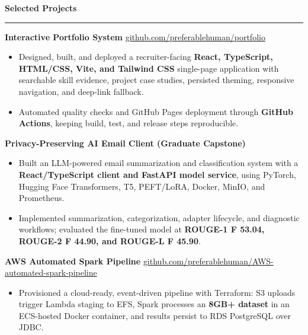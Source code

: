 \documentclass[11pt,letterpaper]{article}
\newcommand{\ressection}[1]{\Needspace{6\baselineskip}\vspace{8pt}\par\textbf{#1}\par\vspace{2pt}\hrule\vspace{5pt}}
\begin{document}
\ressection{Selected Projects}
\textbf{Interactive Portfolio System} \hfill \href{https://github.com/preferablehuman/portfolio}{github.com/preferablehuman/portfolio}
\begin{itemize}
  \item Designed, built, and deployed a recruiter-facing \textbf{React, TypeScript, HTML/CSS, Vite, and Tailwind CSS} single-page application with searchable skill evidence, project case studies, persisted theming, responsive navigation, and deep-link fallback.
  \item Automated quality checks and GitHub Pages deployment through \textbf{GitHub Actions}, keeping build, test, and release steps reproducible.
\end{itemize}
\vspace{2pt}
\textbf{Privacy-Preserving AI Email Client (Graduate Capstone)}
\begin{itemize}
  \item Built an LLM-powered email summarization and classification system with a \textbf{React/TypeScript client and FastAPI model service}, using PyTorch, Hugging Face Transformers, T5, PEFT/LoRA, Docker, MinIO, and Prometheus.
  \item Implemented summarization, categorization, adapter lifecycle, and diagnostic workflows; evaluated the fine-tuned model at \textbf{ROUGE-1 F 53.04, ROUGE-2 F 44.90, and ROUGE-L F 45.90}.
\end{itemize}
\vspace{2pt}
\textbf{AWS Automated Spark Pipeline} \hfill \href{https://github.com/preferablehuman/AWS-automated-spark-pipeline}{github.com/preferablehuman/AWS-automated-spark-pipeline}
\begin{itemize}
  \item Provisioned a cloud-ready, event-driven pipeline with Terraform: S3 uploads trigger Lambda staging to EFS, Spark processes an \textbf{8GB+ dataset} in an ECS-hosted Docker container, and results persist to RDS PostgreSQL over JDBC.
\end{itemize}
\end{document}
